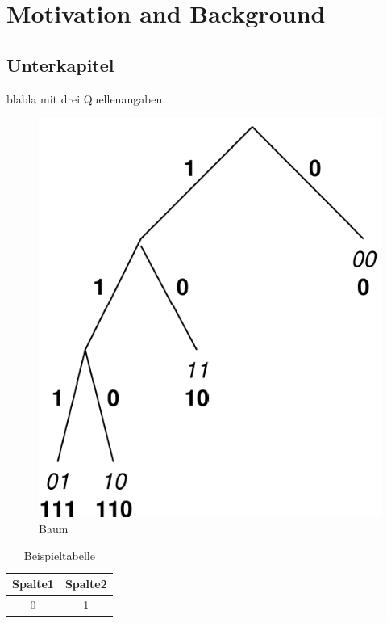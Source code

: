
\section{Motivation and Background}


\subsection{Unterkapitel}

blabla mit drei Quellenangaben\cite{ietf-ipfix-protocol,snoeren2001hash,belenky2003ip}

\begin{figure}[h]%
 	\begin{center}%
 		\includegraphics[scale=0.1]{figure1.png}%
 		\caption{Baum}\label{fig:baum}%
 	\end{center}%
\end{figure}

\begin{table}[h]%
 	\begin{center}%
		\caption{Beispieltabelle}\label{tab:example}%
	 	\begin{tabular}{c|c}%
 			Spalte1 & Spalte2\\
 			\hline
 			0 & 1\\
 		\end{tabular}%
 	\end{center}%
\end{table}
